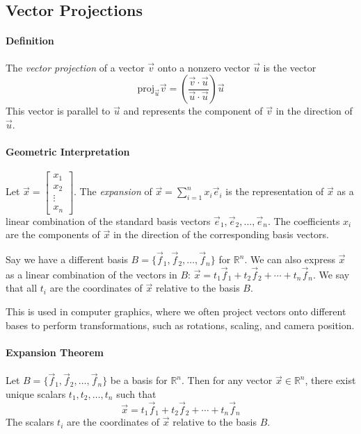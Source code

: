 \subsection{Vector Projections}

\paragraph*{Definition}
The \textit{vector projection} of a vector $\vec{v}$ onto a nonzero vector $\vec{u}$ is the vector
\[\mathrm{proj}_{\vec{u}} \vec{v} = \left( \frac{\vec{v} \cdot \vec{u}}{\vec{u} \cdot \vec{u}} \right) \vec{u}\]
This vector is parallel to $\vec{u}$ and represents the component of $\vec{v}$ in the direction of $\vec{u}$.

\paragraph*{Geometric Interpretation}
Let $\vec{x} = \begin{bmatrix}
x_1 \\ x_2 \\ \vdots \\ x_n
\end{bmatrix}$. The \emph{expansion} of $\vec{x} = \sum_{i=1}^n x_i \vec{e}_i$ is the representation of $\vec{x}$ as a linear combination of the standard basis vectors $\vec{e}_1, \vec{e}_2, \ldots, \vec{e}_n$. 
The coefficients $x_i$ are the components of $\vec{x}$ in the direction of the corresponding basis vectors.

Say we have a different basis $B = \{\vec{f}_1, \vec{f}_2, \ldots, \vec{f}_n\}$ for $\mathbb{R}^n$. 
We can also express $\vec{x}$ as a linear combination of the vectors in $B$: $\vec{x} = t_1 \vec{f}_1 + t_2 \vec{f}_2 + \cdots + t_n \vec{f}_n$. 
We say that all $t_i$ are the coordinates of $\vec{x}$ relative to the basis $B$.

This is used in computer graphics, where we often project vectors onto different bases to perform transformations, such as rotations, scaling, and camera position.

\paragraph*{Expansion Theorem}
Let $B = \{\vec{f}_1, \vec{f}_2, \ldots, \vec{f}_n\}$ be a basis for $\mathbb{R}^n$. Then for any vector $\vec{x} \in \mathbb{R}^n$, there exist unique scalars $t_1, t_2, \ldots, t_n$ such that
\[\vec{x} = t_1 \vec{f}_1 + t_2 \vec{f}_2 + \cdots + t_n \vec{f}_n\]
The scalars $t_i$ are the coordinates of $\vec{x}$ relative to the basis $B$.

